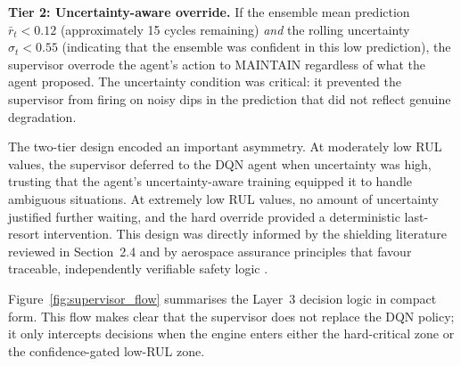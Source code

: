 \documentclass[12pt,a4paper]{report}
\begin{document}
\textbf{Tier 2: Uncertainty-aware override.} If the ensemble mean prediction $\bar{r}_t < 0.12$ (approximately 15 cycles remaining) \emph{and} the rolling uncertainty $\hat{\sigma}_t < 0.55$ (indicating that the ensemble was confident in this low prediction), the supervisor overrode the agent's action to MAINTAIN regardless of what the agent proposed. The uncertainty condition was critical: it prevented the supervisor from firing on noisy dips in the prediction that did not reflect genuine degradation.

The two-tier design encoded an important asymmetry. At moderately low RUL values, the supervisor deferred to the DQN agent when uncertainty was high, trusting that the agent's uncertainty-aware training equipped it to handle ambiguous situations. At extremely low RUL values, no amount of uncertainty justified further waiting, and the hard override provided a deterministic last-resort intervention. This design was directly informed by the shielding literature reviewed in Section~2.4 and by aerospace assurance principles that favour traceable, independently verifiable safety logic \citep{do178c}.


Figure~\ref{fig:supervisor_flow} summarises the Layer~3 decision logic in compact form. This flow makes clear that the supervisor does not replace the DQN policy; it only intercepts decisions when the engine enters either the hard-critical zone or the confidence-gated low-RUL zone.
\end{document}

